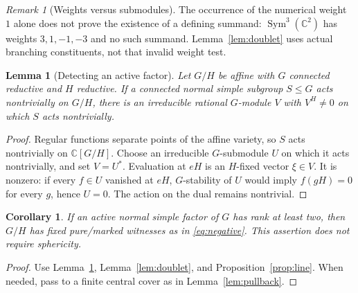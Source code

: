 \documentclass[11pt]{article}
\numberwithin{equation}{section}
\newtheorem{lemma}[theorem]{Lemma}
\newtheorem{corollary}[theorem]{Corollary}
\theoremstyle{definition}
\theoremstyle{remark}
\newtheorem{remark}[theorem]{Remark}
\newcommand{\C}{\mathbb C}
\DeclareMathOperator{\Sym}{Sym}
\begin{document}
\begin{remark}[Weights versus submodules]\label{rem:weight}
The occurrence of the numerical weight $1$ alone does not prove the existence of a defining summand: $\Sym^3(\C^2)$ has weights $3,1,-1,-3$ and no such summand. Lemma~\ref{lem:doublet} uses actual branching constituents, not that invalid weight test.
\end{remark}

\begin{lemma}[Detecting an active factor]\label{lem:detect}
Let $G/H$ be affine with $G$ connected reductive and $H$ reductive. If a connected normal simple subgroup $S\leq G$ acts nontrivially on $G/H$, there is an irreducible rational $G$-module $V$ with $V^H\neq0$ on which $S$ acts nontrivially.
\end{lemma}
\begin{proof}
Regular functions separate points of the affine variety, so $S$ acts nontrivially on $\C[G/H]$. Choose an irreducible $G$-submodule $U$ on which it acts nontrivially, and set $V=U^*$. Evaluation at $eH$ is an $H$-fixed vector $\xi\in V$. It is nonzero: if every $f\in U$ vanished at $eH$, $G$-stability of $U$ would imply $f(gH)=0$ for every $g$, hence $U=0$. The action on the dual remains nontrivial.
\end{proof}

\begin{corollary}\label{cor:highrank}
If an active normal simple factor of $G$ has rank at least two, then $G/H$ has fixed pure/marked witnesses as in \eqref{eq:negative}. This assertion does not require sphericity.
\end{corollary}
\begin{proof}
Use Lemma~\ref{lem:detect}, Lemma~\ref{lem:doublet}, and Proposition~\ref{prop:line}. When needed, pass to a finite central cover as in Lemma~\ref{lem:pullback}.
\end{proof}
\end{document}
